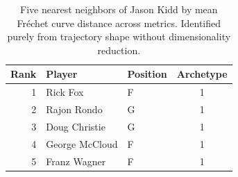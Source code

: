 \begin{table}[htbp]
  \centering\small
  \begin{tabular}{rllc}
    \toprule
    Rank & Player & Position & Archetype \\
    \midrule
    1 & Rick Fox & F & 1 \\
    2 & Rajon Rondo & G & 1 \\
    3 & Doug Christie & G & 1 \\
    4 & George McCloud & F & 1 \\
    5 & Franz Wagner & F & 1 \\
    \bottomrule
  \end{tabular}
  \caption{Five nearest neighbors of Jason Kidd by mean Fr\'{e}chet curve distance across metrics. Identified purely from trajectory shape without dimensionality reduction.}
  \label{tab:Jason_Kidd_frechet_curve_neighbors}
\end{table}

